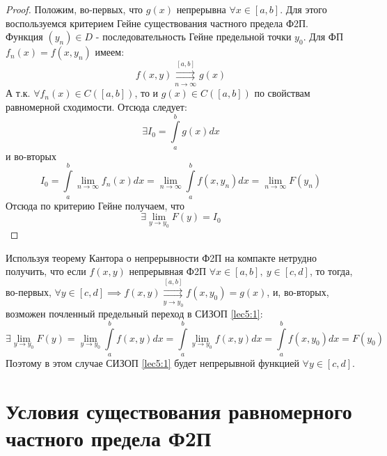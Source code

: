 \documentclass[../../main.tex]{subfiles}
\begin{document}
\begin{proof}
	Положим, во-первых, что $ g(x) $ непрерывна $ \forall x \in [a, b] $.
	Для этого воспользуемся критерием Гейне существования частного предела Ф2П.
	\\
	Функция $ (y_n) \in D $ - последовательность Гейне предельной точки $ y_0 $.
	Для ФП $ f_n(x) = f(x, y_n) $ имеем:
	\[
	f(x, y) \stackrel{[a, b]}{\underset{n \to \infty}{\rightrightarrows}} g(x)
	\]
	А т.к. $ \forall f_n(x) \in C([a, b])$, то и $ g(x) \in C([a, b]) $ по 
	свойствам равномерной сходимости.
	Отсюда следует:
	\[
	\exists I_0 = \int\limits_a^b g(x) dx
	\]
	и во-вторых
	\[
	I_0 = \int\limits_a^b \lim\limits_{n \to \infty} f_n(x) dx = 
	\lim\limits_{n \to \infty} \int\limits_a^b f(x, y_n) dx = 
	\lim\limits_{n \to \infty} F(y_n)
	\]
	Отсюда по критерию Гейне получаем, что
	\[
	\exists \lim\limits_{y \to y_0} F(y) = I_0
	\]
\end{proof}
\begin{rem}
	Используя теорему Кантора о непрерывности Ф2П на компакте нетрудно получить,
	что если $ f(x, y) $ непрерывная Ф2П $ \forall x \in [a, b],\ 
	y \in [c, d] $, то тогда, во-первых, $ \forall y \in [c, d] \implies 
	f(x, y) \stackrel{[a, b]}{\underset{y \to y_0}{\rightrightarrows}} f(x, y_0)
	= g(x)
	$, и, во-вторых, возможен почленный предельный переход 
	в СИЗОП \eqref{lec5:1}:
	\[
	\exists \lim\limits_{y \to y_0} F(y) = 
	\lim\limits_{y \to y_0} \int\limits_a^b f(x, y) dx = 
	\int\limits_a^b \lim\limits_{y \to y_0} f(x, y) dx =
	\int\limits_a^b f(x, y_0) dx = F(y_0)
	\]
	Поэтому в этом случае СИЗОП \eqref{lec5:1} будет непрерывной функцией 
	$ \forall y \in [c, d] $.
\end{rem}

\section{Условия существования равномерного частного предела Ф2П}
\end{document}
